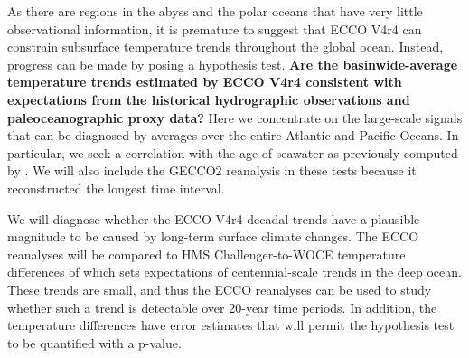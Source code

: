 \documentclass[authoryear,round,12pt]{article}
\begin{document}
As there are regions in the abyss and the polar oceans that have very little observational information, it is premature to suggest that ECCO V4r4 can constrain subsurface temperature trends throughout the global ocean. Instead, progress can be made by posing a hypothesis test.
{\bf Are the basinwide-average temperature trends estimated by ECCO V4r4 consistent with expectations from the historical hydrographic observations and paleoceanographic proxy data?}
Here we concentrate on the large-scale signals that can be diagnosed by averages over the entire Atlantic and Pacific Oceans. %
In particular, we seek a correlation with the age of seawater as previously computed by \citet{Gebbie-Huybers-2012:mean}. We will also include the GECCO2 reanalysis in these tests because it reconstructed the longest time interval. 

We will diagnose whether the ECCO V4r4 decadal trends have a plausible magnitude to be caused by long-term surface climate changes. The ECCO reanalyses will be compared to HMS Challenger-to-WOCE temperature differences of \citet{Gebbie-Huybers-2019:Little} which sets expectations of centennial-scale trends in the deep ocean. These trends are small, and thus the ECCO reanalyses can be used to study whether such a trend is detectable over 20-year time periods. In addition, the temperature differences have error estimates that will permit the hypothesis test to be quantified with a p-value.
\end{document}
